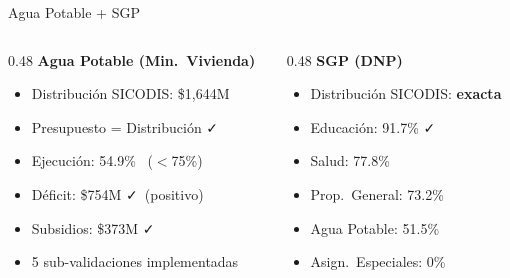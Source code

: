 \documentclass[aspectratio=169,11pt]{beamer}
\newcommand{\cmark}{\textcolor{verde}{\faCheck}}
\newcommand{\xmark}{\textcolor{rojo}{\faTimes}}
\newcommand{\wmark}{\textcolor{amber}{\faExclamationTriangle}}
\begin{document}
\begin{frame}{Agua Potable + SGP}
\footnotesize
\begin{columns}[T]
\begin{column}{0.48\textwidth}
\textbf{Agua Potable (Min.~Vivienda)}
\begin{itemize}\setlength{\itemsep}{1pt}
    \item Distribuci\'on SICODIS: \$1,644M
    \item Presupuesto = Distribuci\'on \cmark
    \item Ejecuci\'on: 54.9\% \xmark\ ($<$75\%)
    \item D\'eficit: \$754M \cmark\ (positivo)
    \item Subsidios: \$373M \cmark
    \item 5 sub-validaciones implementadas
\end{itemize}
\end{column}
\begin{column}{0.48\textwidth}
\textbf{SGP (DNP)}
\begin{itemize}\setlength{\itemsep}{1pt}
    \item Distribuci\'on SICODIS: \textbf{exacta}
    \item Educaci\'on: 91.7\% \cmark
    \item Salud: 77.8\% \wmark
    \item Prop.~General: 73.2\% \wmark
    \item Agua Potable: 51.5\% \wmark
    \item Asign.~Especiales: 0\% \xmark
\end{itemize}
\end{column}
\end{columns}
\end{frame}
\end{document}
